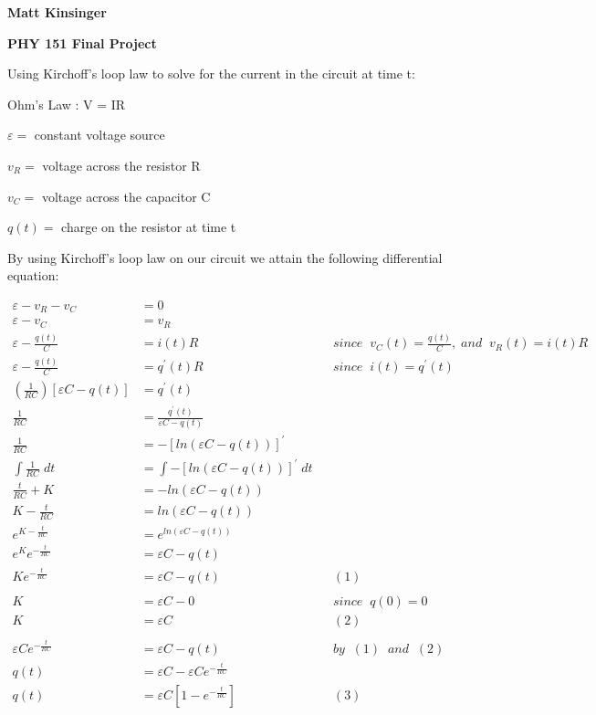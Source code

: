 \documentclass[11pt]{article}
\begin{document}
\vspace*{-.4in}

\begin{center}
{\Large\bf Matt Kinsinger }

{\Large\bf PHY 151 Final Project}

\end{center}



\noindent Using Kirchoff's loop law to solve for the current in the circuit at time t:

\vspace{.2in}

\noindent Ohm's Law : V = IR

\noindent $\varepsilon =$ constant voltage source


\noindent $v_R=$ voltage across the resistor R

\noindent $v_C=$ voltage across the capacitor C

\noindent $q(t)=$ charge on the resistor at time t

\vspace{.2in}

\noindent By using Kirchoff's loop law on our circuit we attain the following differential equation:

\begin{align*}
\varepsilon-v_R-v_C&=0 \\ \varepsilon-v_C&=v_R \\ \varepsilon-\frac{q(t)}{C}&=i(t)R &&since\;\;v_C(t)=\frac{q(t)}{C},\;and\;\;v_R(t)=i(t)R \\ \varepsilon-\frac{q(t)}{C}&=q^{'}(t)R &&since\;\;i(t)=q^{'}(t) \\ \left(\frac{1}{RC}\right)\left[\varepsilon C-q(t)\right]&=q^{'}(t) \\ \frac{1}{RC}&=\frac{q^{'}(t)}{\varepsilon C-q(t)} \\ \frac{1}{RC}&=-\left[ln\left(\varepsilon C-q(t)\right)\right]^{'} \\\int\frac{1}{RC}\;dt&=\int-\left[ln\left(\varepsilon C-q(t)\right)\right]^{'}\;dt \\ \frac{t}{RC}+K&=-ln\left(\varepsilon C-q(t)\right) \\ K-\frac{t}{RC}&=ln\left(\varepsilon C-q(t)\right) \\ e^{K-\frac{t}{RC}}&=e^{ln\left(\varepsilon C-q(t)\right)} \\ e^Ke^{-\frac{t}{RC}}&=\varepsilon C-q(t) \\ Ke^{-\frac{t}{RC}}&=\varepsilon C-q(t)&&(1) \\ \\ K&=\varepsilon C-0&&since\;\;q(0)=0 \\ K&=\varepsilon C&&(2) \\ \\ \varepsilon Ce^{-\frac{t}{RC}}&=\varepsilon C-q(t)&& by\;\;(1)\;\;and\;\;(2) \\ q(t)&=\varepsilon C-\varepsilon Ce^{-\frac{t}{RC}} \\ q(t)&=\varepsilon C\left[1-e^{-\frac{t}{RC}}\right]&&(3)
\end{align*}
\end{document}
